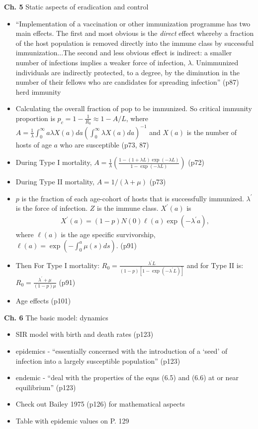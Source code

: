 \message{ !name(refs.tex)}\documentclass{article}
\begin{document}
\textbf{Ch. 5} Static aspects of eradication and control
\begin{itemize}
\item ``Implementation of a vaccination or other immunization programme has two main effects.  The first and most obvious is the \textit{direct} effect whereby a fraction of the host population is removed directly into the immune class by successful immunization...The second and less obvious effect is indirect:  a smaller number of infections implies a weaker force of infection, $\lambda$.  Unimmunized individuals are indirectly protected, to a degree, by the diminution in the number of their fellows who are candidates for spreading infection'' (p87) herd immunity
\item Calculating the overall fraction of pop to be immunized.  So critical immunity proportion is $p_c = 1 - \frac{1}{R_0} \approx 1 - A/L$, where $A = \frac{1}{\lambda} \int_0^\infty a \lambda X(a) da \left ( \int_0^\infty \lambda X(a)da\right )^{-1}$ and $X(a)$ is the number of hosts of age $a$ who are susceptible (p73, 87)
\item During Type I mortality, $A = \frac{1}{\lambda} \left (\frac{1 - (1 + \lambda L)\exp(- \lambda L)}{1 - \exp ( - \lambda L)} \right ) $ (p72)
\item During Type II mortality, $A = 1/ (\lambda + \mu)$ (p73)
\item $p$ is the fraction of each age-cohort of hosts that is successfully immunized.  $\lambda^\prime$ is the force of infection. $Z$ is the immune class.  $X^\prime(a)$ is
\begin{align*}
X^\prime(a) = (1-p)N(0)\ell (a) \exp ( - \lambda^\prime a),
\end{align*}
where $\ell (a)$ is the age specific survivorship, $\ell (a) = \exp \left ( - \int_0^a \mu (s) ds \right )$. (p91)
\item Then For Type I mortality: $R_0 = \frac{ \lambda^\prime L}{(1-p)[1 - \exp ( - \lambda^\prime L)]}$ and for Type II is:  $R_0 = \frac{\lambda^\prime + \mu}{(1-p) \mu}$ (p91)
\item Age effects (p101)

\end{itemize}

\textbf{Ch. 6} The basic model: dynamics

\begin{itemize}
\item SIR model with birth and death rates (p123)
\item epidemics - ``essentially concerned with the introduction of a `seed' of infection into a largely susceptible population'' (p123)
\item endemic - ``deal with the properties of the eqns (6.5) and (6.6) at or near equilibrium'' (p123)
\item Check out Bailey 1975 (p126) for mathematical aspects
\item Table with epidemic values on P. 129
\end{itemize}
\end{document}
